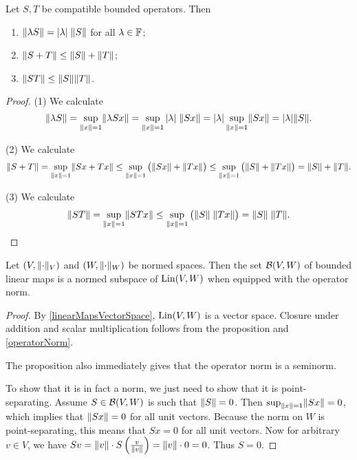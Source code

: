 \begin{proposition} \label{operatorNormIsNorm}
Let $S,T$ be compatible bounded operators. Then
\begin{enumerate}
\item $\lVert\lambda S\rVert = |\lambda|\;\lVert S\rVert$ for all $\lambda\in \mathbb{F}$;
\item $\lVert S+T\rVert \leq \lVert S\rVert+\lVert T\rVert$;
\item $\lVert ST\rVert \leq \lVert S\rVert\lVert T\rVert$.
\end{enumerate}
\end{proposition}
\begin{proof}
(1) We calculate
\[ \lVert\lambda S\rVert = \sup_{\lVert x\rVert=1}\lVert\lambda Sx\rVert = \sup_{\lVert x\rVert=1}|\lambda|\; \lVert Sx\rVert = |\lambda| \sup_{\lVert x\rVert=1}\lVert Sx\rVert = |\lambda| \lVert S\rVert. \]

(2) We calculate
\[ \lVert S+T\rVert = \sup_{\lVert x\rVert=1}\lVert Sx+Tx\rVert \leq \sup_{\lVert x\rVert=1}\big(\lVert Sx\rVert+\lVert Tx\rVert\big)\leq \sup_{\lVert x\rVert=1}\big(\lVert S\rVert + \lVert Tx\rVert\big) = \lVert S\rVert + \lVert T\rVert. \]

(3) We calculate
\[ \lVert ST\rVert = \sup_{\lVert x\rVert=1}\lVert STx\rVert \leq \sup_{\lVert x\rVert=1}\big(\lVert S\rVert\;\lVert Tx\rVert\big) = \lVert S\rVert\;\lVert T\rVert. \]
\end{proof}
\begin{corollary} \label{BoundedSpace}
Let $(V,\lVert\cdot\rVert_V)$ and $(W,\lVert\cdot\rVert_W)$ be normed spaces. Then the set $\operatorname{\mathcal{B}}(V,W)$ of bounded linear maps is a normed subspace of $\operatorname{Lin}(V,W)$ when equipped with the operator norm.
\end{corollary}
\begin{proof}
By \ref{linearMapsVectorSpace}, $\operatorname{Lin}(V,W)$ is a vector space. Closure under addition and scalar multiplication follows from the proposition and \ref{operatorNorm}.

The proposition also immediately gives that the operator norm is a seminorm.

To show that it is in fact a norm, we just need to show that it is point-separating. Assume $S\in\operatorname{\mathcal{B}}(V,W)$ is such that $\lVert S\rVert = 0$. Then $\sup_{\lVert x\rVert=1}\lVert Sx\rVert = 0$, which implies that $\lVert Sx\rVert = 0$ for all unit vectors. Because the norm on $W$ is point-separating, this means that $Sx = 0$ for all unit vectors. Now for arbitrary $v\in V$, we have $Sv = \lVert v\rVert\cdot S\left(\frac{v}{\lVert v\rVert}\right) =\lVert v\rVert \cdot 0 = 0$. Thus $S = 0$.
\end{proof}

